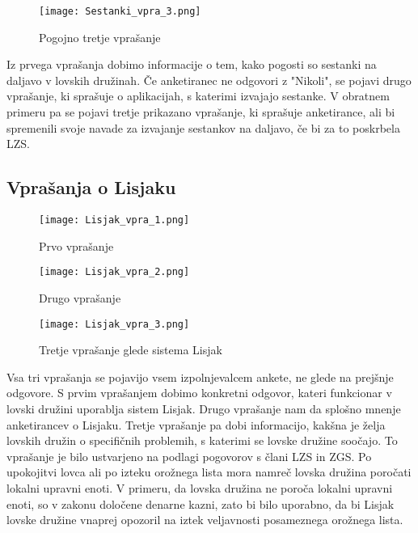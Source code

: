 \documentclass[a4paper,12pt,openright]{book}
\begin{document}
\begin{figure}[h!]
  \centering
  \texttt{[image: Sestanki\_vpra\_3.png]}
  \caption{Pogojno tretje vprašanje}
  \label{fig:sestanki_vpra_3}
\end{figure}

Iz prvega vprašanja dobimo informacije o tem, kako pogosti so sestanki na daljavo v lovskih družinah.
Če anketiranec ne odgovori z "Nikoli", se pojavi drugo vprašanje, ki sprašuje o aplikacijah, s katerimi izvajajo sestanke.
V obratnem primeru pa se pojavi tretje prikazano vprašanje, ki sprašuje anketirance, ali bi spremenili svoje navade za izvajanje sestankov na daljavo, če bi za to poskrbela LZS.

\newpage
\subsection{Vprašanja o Lisjaku}

\begin{figure}[h!]
  \centering
  \begin{minipage}[b]{0.6\textwidth}
    \centering
    \texttt{[image: Lisjak\_vpra\_1.png]}
    \caption{Prvo vprašanje}
    \label{fig:lisjak_vpra_1}
  \end{minipage}
  
  \vspace{0.5cm} %
  
  \begin{minipage}[b]{0.7\textwidth}
    \centering
    \texttt{[image: Lisjak\_vpra\_2.png]}
    \caption{Drugo vprašanje}
    \label{fig:lisjak_vpra_2}
  \end{minipage}
\end{figure}

\begin{figure}[h!]
  \centering
  \texttt{[image: Lisjak\_vpra\_3.png]}
  \caption{Tretje vprašanje glede sistema Lisjak}
  \label{fig:lisjak_vpra_3}
\end{figure}

Vsa tri vprašanja se pojavijo vsem izpolnjevalcem ankete, ne glede na prejšnje odgovore.
S prvim vprašanjem dobimo konkretni odgovor, kateri funkcionar v lovski družini uporablja sistem Lisjak.
Drugo vprašanje nam da splošno mnenje anketirancev o Lisjaku. 
Tretje vprašanje pa dobi informacijo, kakšna je želja lovskih družin o specifičnih problemih, s katerimi se lovske družine soočajo.
To vprašanje je bilo ustvarjeno na podlagi pogovorov s člani LZS in ZGS.
Po upokojitvi lovca ali po izteku orožnega lista mora namreč lovska družina poročati lokalni upravni enoti.
V primeru, da lovska družina ne poroča lokalni upravni enoti, so v zakonu določene denarne kazni, zato bi bilo uporabno, da bi Lisjak lovske družine vnaprej opozoril na iztek veljavnosti posameznega orožnega lista.
\end{document}
